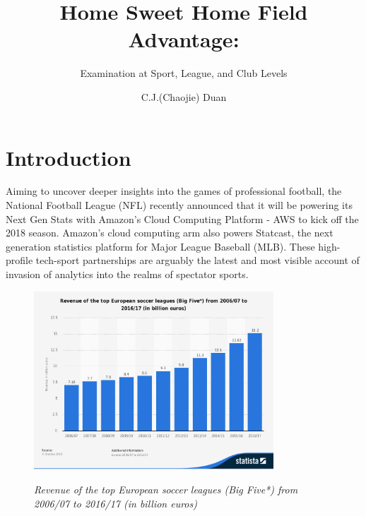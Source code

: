 \documentclass[USenglish]{article}
\begin{document}

  \author*[1]{C.J.(Chaojie) Duan}
  \title{Home Sweet Home Field Advantage:}
  \subtitle{Examination at Sport, League, and Club Levels}
\maketitle

\section{Introduction} 


Aiming to uncover deeper insights into the games of professional football, the National Football League (NFL) recently announced that it will be powering its Next Gen Stats with Amazon's Cloud Computing Platform - AWS to kick off the 2018 season. %
Amazon’s cloud computing arm also powers Statcast, the next generation statistics platform for Major League Baseball (MLB). These high-profile tech-sport partnerships are arguably the latest and most visible account of invasion of analytics into the realms of spectator sports.

\begin{figure}[ht]
\caption{\textit{Revenue of the top European soccer leagues (Big Five*) from 2006/07 to 2016/17 (in billion euros)}}

\centering\includegraphics[width=0.8\textwidth]{HFA11.pdf}
\label{fig11}
\end{figure}
\end{document}
